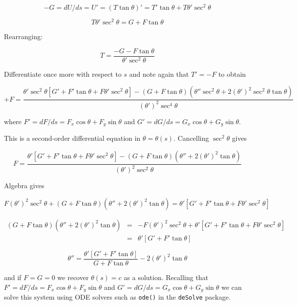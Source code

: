 \documentclass{article}
\begin{document}
\begin{equation}
  -G=dU/ds=U'=(T\tan\theta)'=T'\tan\theta + T\theta'\sec^2\theta
\end{equation}


\begin{equation}
  T\theta'\sec^2\theta=G+F\tan\theta
\end{equation}

Rearranging:

\begin{equation}
T=\frac{-G-F\tan\theta}{\theta'\sec^2\theta}
\end{equation}

Differentiate once more with respect to $s$ and note again that
$T'=-F$ to obtain

\begin{equation}
  +F=\frac
{    \theta'\sec^2\theta\left[G'+F'\tan\theta+F\theta'\sec^2\theta\right]-(G+F\tan\theta)(\theta''\sec^2\theta+2(\theta')^2\sec^2\theta\tan\theta)
  }{
    (\theta')^2\sec^4\theta
  }
\end{equation}

where $F'=dF/ds=F_x\cos\theta+F_y\sin\theta$ and
$G'=dG/ds=G_x\cos\theta+G_y\sin\theta$.

This is a second-order
differential equation in $\theta=\theta(s)$.
Cancelling $\sec^2\theta$  gives

\begin{equation}
  F=\frac{\theta'\left[G'+F'\tan\theta+F\theta'\sec^2\theta\right]-(G+F\tan\theta)(\theta''+2(\theta')^2\tan\theta)
  }{
    (\theta')^2\sec^2\theta
  }
\end{equation}


Algebra gives

\begin{equation}
  F(\theta')^2\sec^2\theta + (G+F\tan\theta)(\theta''+2(\theta')^2\tan\theta)
  =
\theta'\left[G'+F'\tan\theta+F\theta'\sec^2\theta\right]
\end{equation}

\begin{eqnarray}
  (G+F\tan\theta)(\theta''+2(\theta')^2\tan\theta)
  &=&
  -F(\theta')^2\sec^2\theta
  +
  \theta'\left[G'+F'\tan\theta+F\theta'\sec^2\theta\right]\\
  &=&    \theta'\left[G'+F'\tan\theta\right] 
\end{eqnarray}

\begin{equation}
  \theta''=
  \frac{
    \theta'\left[G'+F'\tan\theta\right]
  }{
    G+F\tan\theta
  }
  -2(\theta')^2\tan\theta
\end{equation}

and if $F=G=0$ we recover $\theta(s)=c$ as a solution.  Recalling that
$F'=dF/ds=F_x\cos\theta+F_y\sin\theta$ and
$G'=dG/ds=G_x\cos\theta+G_y\sin\theta$ we can solve this system using
ODE solvers such as {\tt ode()} in the {\tt deSolve} package.




\end{document}
